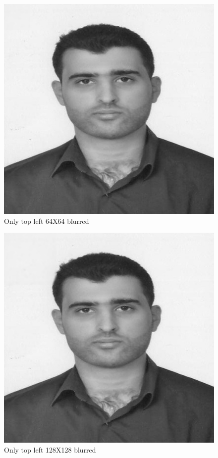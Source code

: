 \documentclass{article}
\begin{document}
\begin{figure}[H]
	\includegraphics[scale=1]{blurred_piece_by_piece64.jpg}
	\caption {Only top left 64X64 blurred}
\end{figure}
\begin{figure}[H]
	\includegraphics[scale=1]{blurred_piece_by_piece128.jpg}
	\caption {Only top left 128X128 blurred}
\end{figure}
\end{document}
